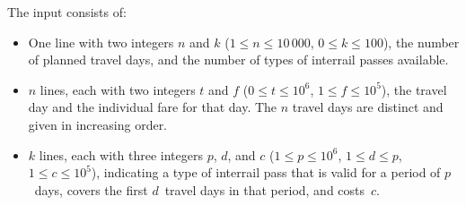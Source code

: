 
    The input consists of:
    \begin{itemize}
        \item One line with two integers $n$ and $k$ ($1\leq n\leq 10\,000$,
    $0\leq k\leq 100$), the number of planned travel days,
    and the number of types of interrail passes available.
        \item $n$ lines, each with two integers $t$ and $f$ ($0\leq
    t \leq 10^6$, $1\leq f\leq 10^5$), the travel day and the
    individual fare for that day.
    The $n$ travel days are distinct and given in increasing order.
        \item $k$ lines, each with three integers $p$, $d$, and $c$ ($1\leq
    p\leq 10^6$, $1\leq d\leq p$, $1\leq c\leq 10^5$), indicating a type of
    interrail pass that is valid for a period of $p$~days, covers the first
    $d$~travel days in that period, and costs~$c$.
    \end{itemize}
